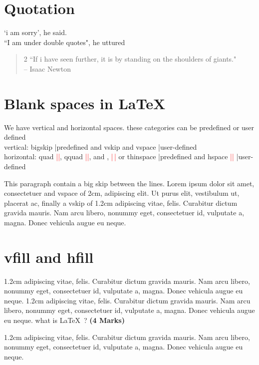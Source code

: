 \documentclass{book}
\begin{document}
	\section{Quotation}
	`i am sorry', he said.\\
	``I am under double	quotes", he uttured\\
	\lipsum[1][1-11]	
	\begin{quote}
		\begin{spacing}{2}
		``If i have seen further, it is by standing on the shoulders of giants."\\
		\raggedleft
		-- Isaac Newton
		\end{spacing}
	\end{quote}
	\lipsum[1][1-5]
	
	\section{Blank spaces in \LaTeX\ }
	
	We have vertical and horizontal spaces.	
	these categories can be predefined or user defined\\
	vertical: bigskip |predefined and vskip and vspace |user-defined\\
	horizontal: quad \textcolor{red}{|\quad|}, qquad \textcolor{red}{|\qquad|}, and , \textcolor{red}{|\,|} or thinspace |predefined and hspace \textcolor{red}{|\hspace{2cm}|} |user-defined
	
	\par
	This paragraph contain a \bigskip big skip between the lines. Lorem ipsum dolor sit amet, consectetuer and vspace of 2cm, \vspace{2cm} adipiscing elit. Ut purus elit, vestibulum ut, placerat ac, finally a vskip of 1.2cm \vskip 1.2cm adipiscing vitae, felis. Curabitur dictum gravida mauris. Nam arcu libero, nonummy eget, consectetuer id, vulputate a, magna. Donec vehicula augue eu neque.
			
	\section{vfill and hfill}
	\par 
	1.2cm adipiscing vitae, felis. Curabitur dictum gravida mauris. Nam arcu libero, nonummy eget, consectetuer id, vulputate a, magna. Donec vehicula augue eu neque.
	\vfill
	1.2cm adipiscing vitae, felis. Curabitur dictum gravida mauris. Nam arcu libero, nonummy eget, consectetuer id, vulputate a, magna. Donec vehicula augue eu \hfill neque.
	\vfill
	what is \LaTeX\ ? \hfill \textbf{(4 Marks)}
	\vfill
	\par 
	1.2cm adipiscing vitae, felis. Curabitur dictum gravida mauris. Nam arcu libero, nonummy eget, consectetuer id, vulputate a, magna. Donec vehicula augue eu neque.
\end{document}
